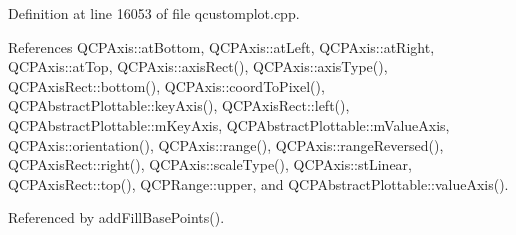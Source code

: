 Definition at line 16053 of file qcustomplot.\+cpp.



References Q\+C\+P\+Axis\+::at\+Bottom, Q\+C\+P\+Axis\+::at\+Left, Q\+C\+P\+Axis\+::at\+Right, Q\+C\+P\+Axis\+::at\+Top, Q\+C\+P\+Axis\+::axis\+Rect(), Q\+C\+P\+Axis\+::axis\+Type(), Q\+C\+P\+Axis\+Rect\+::bottom(), Q\+C\+P\+Axis\+::coord\+To\+Pixel(), Q\+C\+P\+Abstract\+Plottable\+::key\+Axis(), Q\+C\+P\+Axis\+Rect\+::left(), Q\+C\+P\+Abstract\+Plottable\+::m\+Key\+Axis, Q\+C\+P\+Abstract\+Plottable\+::m\+Value\+Axis, Q\+C\+P\+Axis\+::orientation(), Q\+C\+P\+Axis\+::range(), Q\+C\+P\+Axis\+::range\+Reversed(), Q\+C\+P\+Axis\+Rect\+::right(), Q\+C\+P\+Axis\+::scale\+Type(), Q\+C\+P\+Axis\+::st\+Linear, Q\+C\+P\+Axis\+Rect\+::top(), Q\+C\+P\+Range\+::upper, and Q\+C\+P\+Abstract\+Plottable\+::value\+Axis().



Referenced by add\+Fill\+Base\+Points().


